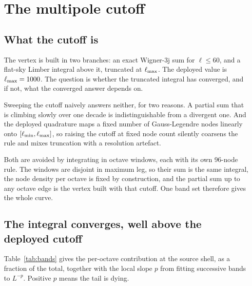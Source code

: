 \section{The multipole cutoff}
\label{sec:cutoff}

\subsection{What the cutoff is}

The vertex is built in two branches: an exact Wigner-3j sum for
$\ell\le60$, and a flat-sky Limber integral above it, truncated at
$\ell_{\max}$. The deployed value is $\ell_{\max}=1000$. The question is whether the
truncated integral has converged, and if not, what the converged answer
depends on.

Sweeping the cutoff naively answers neither, for two reasons. A partial sum
that is climbing slowly over one decade is indistinguishable from a
divergent one. And the deployed quadrature maps a fixed number of
Gauss-Legendre nodes linearly onto $[\ell_{\min},\ell_{\max}]$, so raising the
cutoff at fixed node count silently coarsens the rule and mixes truncation
with a resolution artefact.

Both are avoided by integrating in octave windows, each with its own
96-node rule. The windows are disjoint in maximum leg, so their sum is the
same integral, the node density per octave is fixed by construction, and
the partial sum up to any octave edge is the vertex built with that cutoff.
One band set therefore gives the whole curve.

\subsection{The integral converges, well above the deployed cutoff}

Table~\ref{tab:bands} gives the per-octave contribution at the source
shell, as a fraction of the total, together with the local slope $p$ from
fitting successive bands to $L^{-p}$. Positive $p$ means the tail is dying.

